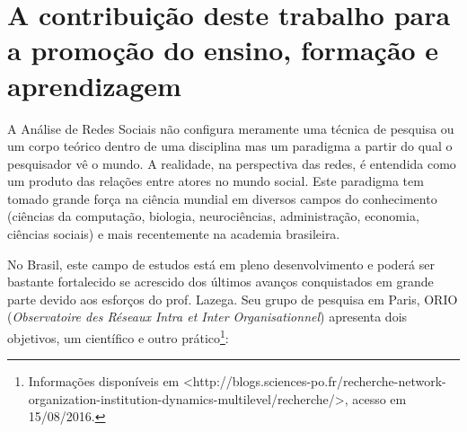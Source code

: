 \documentclass[a4paper, 12pt, openright, oneside, german, french, english, brazil, article]{abntex2}
\begin{document}
\section{A contribuição deste trabalho para a promoção do ensino, formação e aprendizagem}

A Análise de Redes Sociais não configura meramente uma técnica de pesquisa ou um corpo teórico dentro de uma disciplina mas um paradigma a partir do qual o pesquisador vê o mundo. A realidade, na perspectiva das redes, é entendida como um produto das relações entre atores no mundo social. Este paradigma tem tomado grande força na ciência mundial em diversos campos do conhecimento (ciências da computação, biologia, neurociências, administração, economia, ciências sociais) e mais recentemente na academia brasileira.

No Brasil, este campo de estudos está em pleno desenvolvimento e poderá ser bastante fortalecido se acrescido dos últimos avanços conquistados em grande parte devido aos esforços do prof. Lazega. Seu grupo de pesquisa em Paris, ORIO (\textit{Observatoire des Réseaux Intra et Inter Organisationnel}) apresenta dois objetivos, um científico e outro prático\footnote{Informações disponíveis em \textless http://blogs.sciences-po.fr/recherche-network-organization-institution-dynamics-multilevel/recherche/\textgreater, acesso em 15/08/2016.}:
\end{document}
